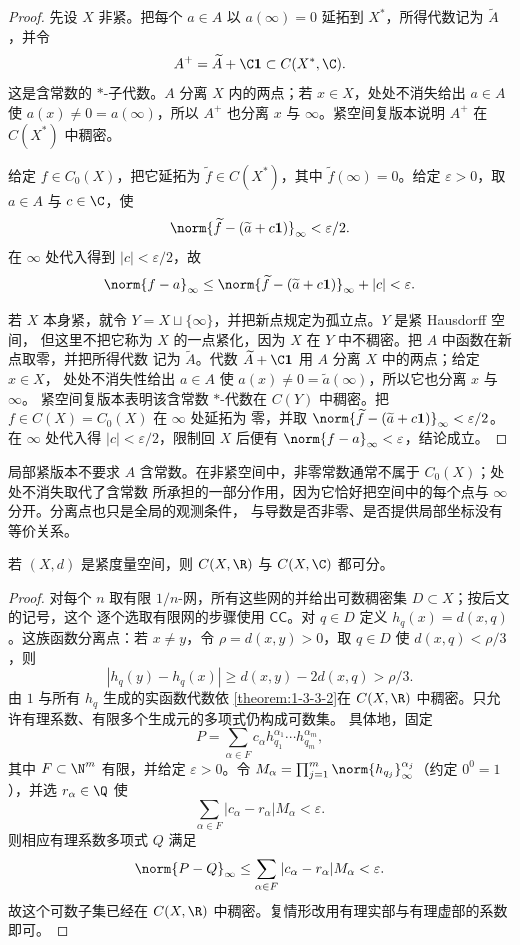 \begin{proof}
先设 $X$ 非紧。把每个 $a\in A$ 以 $a(\infty)=0$ 延拓到 $X^*$，所得代数记为 $\widetilde A$，并令
\[
  A^+=\widetilde A+\C\mathbf1\subset C(X^*,\C).
\]
这是含常数的 $*$-子代数。$A$ 分离 $X$ 内的两点；若 $x\in X$，处处不消失给出 $a\in A$ 使
$a(x)\ne0=a(\infty)$，所以 $A^+$ 也分离 $x$ 与 $\infty$。紧空间复版本说明 $A^+$ 在
$C(X^*)$ 中稠密。

给定 $f\in C_0(X)$，把它延拓为 $\widetilde f\in C(X^*)$，其中 $\widetilde f(\infty)=0$。给定
$\varepsilon>0$，取 $a\in A$ 与 $c\in\C$，使
\[
 \norm{\widetilde f-(\widetilde a+c\mathbf1)}_\infty<\varepsilon/2.
\]
在 $\infty$ 处代入得到 $|c|<\varepsilon/2$，故
\[
 \norm{f-a}_\infty
 \le\norm{\widetilde f-(\widetilde a+c\mathbf1)}_\infty+|c|
 <\varepsilon.
\]

若 $X$ 本身紧，就令 $Y=X\sqcup\{\infty\}$，并把新点规定为孤立点。$Y$ 是紧 Hausdorff 空间，
但这里不把它称为 $X$ 的一点紧化，因为 $X$ 在 $Y$ 中不稠密。把 $A$ 中函数在新点取零，并把所得代数
记为 $\widetilde A$。代数 $\widetilde A+\C\mathbf1$ 用 $A$ 分离 $X$ 中的两点；给定 $x\in X$，
处处不消失性给出 $a\in A$ 使 $a(x)\ne0=\widetilde a(\infty)$，所以它也分离 $x$ 与 $\infty$。
紧空间复版本表明该含常数 $*$-代数在 $C(Y)$ 中稠密。把 $f\in C(X)=C_0(X)$ 在 $\infty$ 处延拓为
零，并取
\(\norm{\widetilde f-(\widetilde a+c\mathbf1)}_\infty<\varepsilon/2\)。在 $\infty$ 处代入得
$|c|<\varepsilon/2$，限制回 $X$ 后便有
$\norm{f-a}_\infty<\varepsilon$，结论成立。
\end{proof}

局部紧版本不要求 $A$ 含常数。在非紧空间中，非零常数通常不属于 $C_0(X)$；处处不消失取代了含常数
所承担的一部分作用，因为它恰好把空间中的每个点与 $\infty$ 分开。分离点也只是全局的观测条件，
与导数是否非零、是否提供局部坐标没有等价关系。

\begin{corollary}[紧度量空间上的可数稠密测试族]\label{corollary:1-3-3-separable}
若 $(X,d)$ 是紧度量空间，则 $C(X,\R)$ 与 $C(X,\C)$ 都可分。
\end{corollary}

\begin{proof}
对每个 $n$ 取有限 $1/n$-网，所有这些网的并给出可数稠密集 $D\subset X$；按后文的记号，这个
逐个选取有限网的步骤使用 $\textsf{CC}$。对 $q\in D$ 定义
$h_q(x)=d(x,q)$。这族函数分离点：若 $x\ne y$，令 $\rho=d(x,y)>0$，取
$q\in D$ 使 $d(x,q)<\rho/3$，则
\[
 |h_q(y)-h_q(x)|
 \ge d(x,y)-2d(x,q)>\rho/3.
\]
由 $1$ 与所有 $h_q$ 生成的实函数代数依
\cref{theorem:1-3-3-2}在 $C(X,\R)$ 中稠密。只允许有理系数、有限多个生成元的多项式仍构成可数集。
具体地，固定
\[
  P=\sum_{\alpha\in F}c_\alpha
       h_{q_1}^{\alpha_1}\cdots h_{q_m}^{\alpha_m},
\]
其中 $F\subset\N^m$ 有限，并给定 $\varepsilon>0$。令
$M_\alpha=\prod_{j=1}^m\norm{h_{q_j}}_\infty^{\alpha_j}$（约定 $0^0=1$），并选
$r_\alpha\in\Q$ 使
\[
  \sum_{\alpha\in F}|c_\alpha-r_\alpha|M_\alpha<\varepsilon.
\]
则相应有理系数多项式 $Q$ 满足
\[
  \norm{P-Q}_\infty
  \le\sum_{\alpha\in F}|c_\alpha-r_\alpha|M_\alpha<\varepsilon.
\]
故这个可数子集已经在 $C(X,\R)$ 中稠密。复情形改用有理实部与有理虚部的系数即可。
\end{proof}

